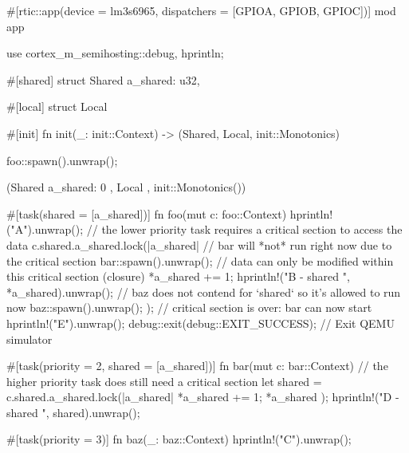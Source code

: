 #[rtic::app(device = lm3s6965, dispatchers = [GPIOA, GPIOB, GPIOC])]
mod app {
    use cortex_m_semihosting::{debug, hprintln};

    #[shared]
    struct Shared {
        a_shared: u32,
    }

    #[local]
    struct Local {}

    #[init]
    fn init(_: init::Context) -> (Shared, Local, init::Monotonics) {
        foo::spawn().unwrap();

        (Shared { a_shared: 0 }, Local {}, init::Monotonics())
    }

    #[task(shared = [a_shared])]
    fn foo(mut c: foo::Context) {
        hprintln!("A").unwrap();
        // the lower priority task requires a critical section to access the data
        c.shared.a_shared.lock(|a_shared| {
            // bar will *not* run right now due to the critical section
            bar::spawn().unwrap(); 
            // data can only be modified within this critical section (closure)
            *a_shared += 1; 
            hprintln!("B - shared {}", *a_shared).unwrap();
            // baz does not contend for `shared` so it's allowed to run now
            baz::spawn().unwrap();
        });
        // critical section is over: bar can now start
        hprintln!("E").unwrap();
        debug::exit(debug::EXIT_SUCCESS); // Exit QEMU simulator
    }

    #[task(priority = 2, shared = [a_shared])]
    fn bar(mut c: bar::Context) {
        // the higher priority task does still need a critical section
        let shared = c.shared.a_shared.lock(|a_shared| {
            *a_shared += 1;
            *a_shared
        });
        hprintln!("D - shared {}", shared).unwrap();
    }

    #[task(priority = 3)]
    fn baz(_: baz::Context) {
        hprintln!("C").unwrap();
    }
}

